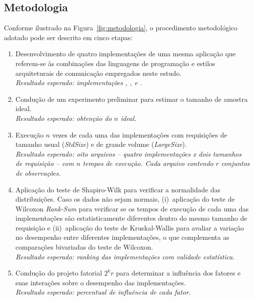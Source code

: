 \subsection{Metodologia}
Conforme ilustrado na Figura~\ref{fig:metodologia}, o procedimento metodológico adotado pode ser descrito em cinco etapas:
%
\begin{enumerate}
    \item Desenvolvimento de quatro implementações de uma
mesma aplicação que referem-se às combinações das linguagens de programação e estilos arquiteturais de comunicação empregados neste estudo.\\
{\em Resultado esperado: implementações \gogrpc{}, \gorest{}, \javagrpc{} e \javarest{}.}\\

    \item Condução de um experimento preliminar para estimar o tamanho de amostra ideal.\\
    {\em Resultado esperado: obtenção do $n$ ideal.}\\

    \item Execução $n$ vezes de cada uma das implementações com requisições de tamanho usual ({\em StdSize}) e de grande volume ({\em LargeSize}). \\
    {\em Resultado esperado: oito arquivos -- quatro implementações x dois tamanhos de requisição  -- com $n$ tempos de execução. Cada arquivo contendo $r$ conjuntos de observações.}\\

    \item Aplicação do teste de Shapiro-Wilk para verificar a normalidade das distribuições. Caso os dados não sejam normais, 
        (i)~aplicação do teste de Wilcoxon \textit{Rank-Sum} para verificar se os tempos de execução de cada uma das implementações são estatisticamente 
        diferentes dentro do mesmo tamanho de requisição e (ii)~aplicação do teste de Kruskal-Wallis
        para avaliar a variação no desempenho entre diferentes implementações, o que complementa 
        as comparações bivariadas do teste de Wilcoxon.\\
    {\em Resultado esperado: {\em ranking} das implementações com validade estatística.}\\

    \item Condução do projeto fatorial $2^kr$ para determinar a influência dos fatores e suas interações sobre o desempenho das implementações.\\
    {\em Resultado esperado: percentual de influência de cada fator.}
\end{enumerate}

